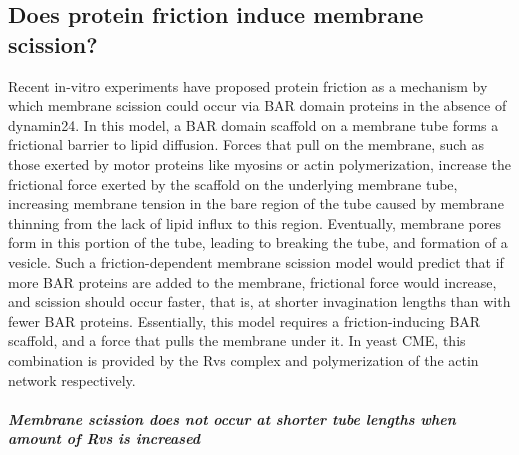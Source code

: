 	
	\subsection{Does protein friction induce membrane scission? }
	
	Recent in-vitro experiments have proposed protein friction as a mechanism by which membrane scission could occur via BAR domain proteins in the absence of dynamin24. In this model, a BAR domain scaffold on a membrane tube forms a frictional barrier to lipid diffusion. Forces that pull on the membrane, such as those exerted by motor proteins like myosins or actin polymerization, increase the frictional force exerted by the scaffold on the underlying membrane tube, increasing membrane tension in the bare region of the tube caused by membrane thinning from the lack of lipid influx to this region. Eventually, membrane pores form in this portion of the tube, leading to breaking the tube, and formation of a vesicle. Such a friction-dependent membrane scission model would predict that if more BAR proteins are added to the membrane, frictional force would increase, and scission should occur faster, that is, at shorter invagination lengths than with fewer BAR proteins. Essentially, this model requires a friction-inducing BAR scaffold, and a force that pulls the membrane under it. In yeast CME, this combination is provided by the Rvs complex and polymerization of the actin network respectively. 
	

	\subparagraph{Membrane scission does not occur at shorter tube lengths when amount of Rvs is increased}
		\mbox{}\\
		
